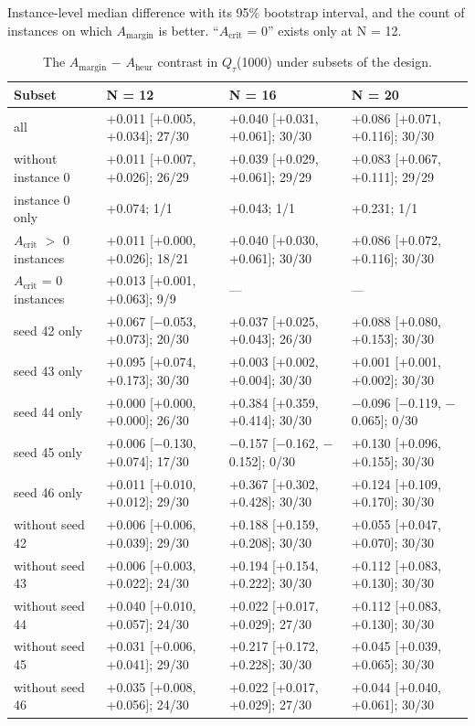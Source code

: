 \documentclass[journal]{IEEEtran}
\begin{document}
Instance-level median difference with its 95\% bootstrap interval, and the count of instances on which $A_{\mathrm{margin}}$ is better. ``$A_{\mathrm{crit}}$ = 0'' exists only at N = 12.


\begin{table}[!t]
\centering
\scriptsize
\caption{The $A_{\mathrm{margin}}$ $-$ $A_{\mathrm{heur}}$ contrast in $Q_{\tau}$(1000) under subsets of the design.}
\label{tab:S19}
\begin{tabular}{p{}p{}p{}p{}}
\toprule
Subset & N = 12 & N = 16 & N = 20 \\
\midrule
all & +0.011 [+0.005, +0.034]; 27/30 & +0.040 [+0.031, +0.061]; 30/30 & +0.086 [+0.071, +0.116]; 30/30 \\
without instance 0 & +0.011 [+0.007, +0.026]; 26/29 & +0.039 [+0.029, +0.061]; 29/29 & +0.083 [+0.067, +0.111]; 29/29 \\
instance 0 only & +0.074; 1/1 & +0.043; 1/1 & +0.231; 1/1 \\
$A_{\mathrm{crit}}$ $>$ 0 instances & +0.011 [+0.000, +0.026]; 18/21 & +0.040 [+0.030, +0.061]; 30/30 & +0.086 [+0.072, +0.116]; 30/30 \\
$A_{\mathrm{crit}}$ = 0 instances & +0.013 [+0.001, +0.063]; 9/9 & --- & --- \\
seed 42 only & +0.067 [$-$0.053, +0.073]; 20/30 & +0.037 [+0.025, +0.043]; 26/30 & +0.088 [+0.080, +0.153]; 30/30 \\
seed 43 only & +0.095 [+0.074, +0.173]; 30/30 & +0.003 [+0.002, +0.004]; 30/30 & +0.001 [+0.001, +0.002]; 30/30 \\
seed 44 only & +0.000 [+0.000, +0.000]; 26/30 & +0.384 [+0.359, +0.414]; 30/30 & $-$0.096 [$-$0.119, $-$0.065]; 0/30 \\
seed 45 only & +0.006 [$-$0.130, +0.074]; 17/30 & $-$0.157 [$-$0.162, $-$0.152]; 0/30 & +0.130 [+0.096, +0.155]; 30/30 \\
seed 46 only & +0.011 [+0.010, +0.012]; 29/30 & +0.367 [+0.302, +0.428]; 30/30 & +0.124 [+0.109, +0.170]; 30/30 \\
without seed 42 & +0.006 [+0.006, +0.039]; 29/30 & +0.188 [+0.159, +0.208]; 30/30 & +0.055 [+0.047, +0.070]; 30/30 \\
without seed 43 & +0.006 [+0.003, +0.022]; 24/30 & +0.194 [+0.154, +0.222]; 30/30 & +0.112 [+0.083, +0.130]; 30/30 \\
without seed 44 & +0.040 [+0.010, +0.057]; 24/30 & +0.022 [+0.017, +0.029]; 27/30 & +0.112 [+0.083, +0.130]; 30/30 \\
without seed 45 & +0.031 [+0.006, +0.041]; 29/30 & +0.217 [+0.172, +0.228]; 30/30 & +0.045 [+0.039, +0.065]; 30/30 \\
without seed 46 & +0.035 [+0.008, +0.056]; 24/30 & +0.022 [+0.017, +0.029]; 27/30 & +0.044 [+0.040, +0.061]; 30/30 \\
\bottomrule
\end{tabular}
\end{table}
\end{document}
